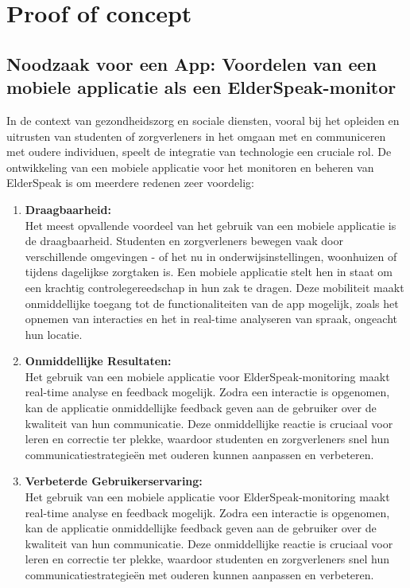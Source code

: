 
\chapter{Proof of concept}%
\label{ch:poc}

\section{Noodzaak voor een App: Voordelen van een mobiele applicatie als een ElderSpeak-monitor}

In de context van gezondheidszorg en sociale diensten, vooral bij het opleiden en uitrusten van studenten of zorgverleners in het omgaan met en communiceren met oudere individuen, speelt de integratie van technologie een cruciale rol. De ontwikkeling van een mobiele applicatie voor het monitoren en beheren van ElderSpeak is om meerdere redenen zeer voordelig:


\begin{enumerate}[label=\arabic*.]
    
    \item \textbf{Draagbaarheid:}\\
    Het meest opvallende voordeel van het gebruik van een mobiele applicatie is de draagbaarheid. Studenten en zorgverleners bewegen vaak door verschillende omgevingen - of het nu in onderwijsinstellingen, woonhuizen of tijdens dagelijkse zorgtaken is. Een mobiele applicatie stelt hen in staat om een krachtig controlegereedschap in hun zak te dragen. Deze mobiliteit maakt onmiddellijke toegang tot de functionaliteiten van de app mogelijk, zoals het opnemen van interacties en het in real-time analyseren van spraak, ongeacht hun locatie.
    
    \item \textbf{Onmiddellijke Resultaten:}\\
    Het gebruik van een mobiele applicatie voor ElderSpeak-monitoring maakt real-time analyse en feedback mogelijk. Zodra een interactie is opgenomen, kan de applicatie onmiddellijke feedback geven aan de gebruiker over de kwaliteit van hun communicatie. Deze onmiddellijke reactie is cruciaal voor leren en correctie ter plekke, waardoor studenten en zorgverleners snel hun communicatiestrategieën met ouderen kunnen aanpassen en verbeteren.
    
    
    \item \textbf{Verbeterde Gebruikerservaring:}\\
    Het gebruik van een mobiele applicatie voor ElderSpeak-monitoring maakt real-time analyse en feedback mogelijk. Zodra een interactie is opgenomen, kan de applicatie onmiddellijke feedback geven aan de gebruiker over de kwaliteit van hun communicatie. Deze onmiddellijke reactie is cruciaal voor leren en correctie ter plekke, waardoor studenten en zorgverleners snel hun communicatiestrategieën met ouderen kunnen aanpassen en verbeteren.

\end{enumerate}






